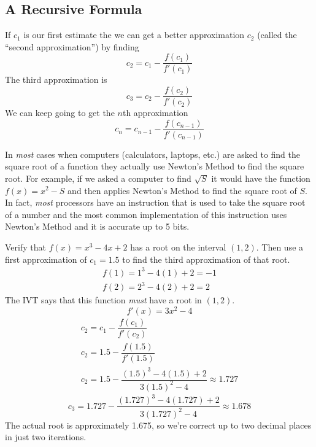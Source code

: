 \subsection{A Recursive Formula}
If $c_1$ is our first estimate the we can get a better approximation $c_2$ (called the ``second approximation'') by finding
\begin{equation*}
    c_2 = c_1 - \dfrac{f(c_1)}{f'(c_1)}
\end{equation*}
The third approximation is
\begin{equation*}
    c_3 = c_2 - \dfrac{f(c_2)}{f'(c_2)}
\end{equation*}
We can keep going to get the $n$th approximation
\begin{equation}
    c_n = c_{n - 1} - \dfrac{f(c_{n - 1})}{f'(c_{n - 1})}
\end{equation}
\begin{note}
    In \textit{most} cases when computers (calculators, laptops, etc.) are asked to find the square root of a function they actually use Newton's Method to find the square root. For example, if we asked a computer to find $\sqrt{S}$ it would have the function $f(x) = x^2 - S$ and then applies Newton's Method to find the square root of $S$. In fact, \textit{most} processors have an instruction that is used to take the square root of a number and the most common implementation of this instruction uses Newton's Method and it is accurate up to 5 bits.
\end{note}
\begin{example}
    Verify that $f(x) = x^3 - 4x + 2$ has a root on the interval $(1, 2)$. Then use a first approximation of $c_1 = 1.5$ to find the third approximation of that root.
    \begin{gather*}
        f(1) = 1^3 - 4(1) + 2 = -1 \\
        f(2) = 2^3 - 4(2) + 2 = 2
    \end{gather*}
    The IVT says that this function \textit{must} have a root in $(1, 2)$.
    \begin{equation*}
        f'(x) = 3x^2 - 4
    \end{equation*}
    \begin{gather*}
        c_2 = c_1 - \dfrac{f(c_1)}{f'(c_2)} \\
        c_2 = 1.5 - \dfrac{f(1.5)}{f'(1.5)} \\
        c_2 = 1.5 - \dfrac{(1.5)^3 - 4(1.5) + 2}{3(1.5)^2 - 4} \approx 1.727
    \end{gather*}
    \begin{equation*}
        c_3 = 1.727 - \dfrac{(1.727)^3 - 4(1.727) + 2}{3(1.727)^2 - 4} \approx 1.678
    \end{equation*}
    The actual root is approximately 1.675, so we're correct up to two decimal places in just two iterations.
\end{example}
